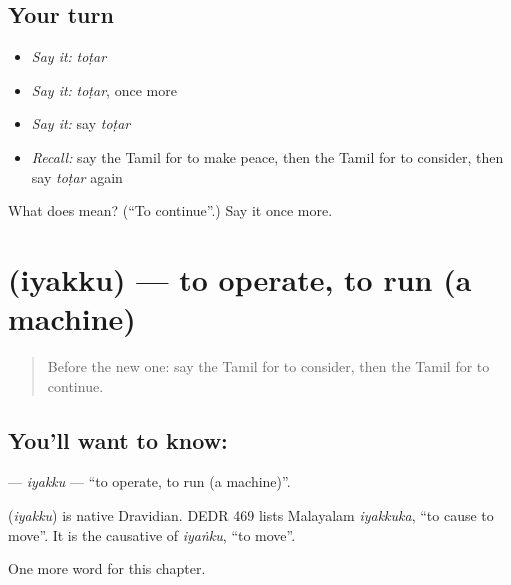 \subsection*{Your turn}
\begin{itemize}
\raggedright
  \item \emph{Say it:} \emph{toṭar}
  \item \emph{Say it:} \emph{toṭar}, once more
  \item \emph{Say it:} say \emph{toṭar}
  \item \emph{Recall:} say the Tamil for to make peace, then the Tamil for to consider, then say \emph{toṭar} again
\end{itemize}

\begin{tcolorbox}[breakable,colback=teal!4,colframe=teal!35!black,title={Before you move on}]
What does  mean? (\textquotedblleft{}To continue\textquotedblright{}.) Say it once more.
\end{tcolorbox}
\section[\texorpdfstring{\ta{இயக்கு} (iyakku)}{இயக்கு (iyakku)}]{ (iyakku) — to operate, to run (a machine)}

\label{lesson:TA-C167-iyakku}



\begin{quote}
Before the new one: say the Tamil for to consider, then the Tamil for to continue.
\end{quote}

\subsection*{You'll want to know: }
\textbf{} — \emph{iyakku} — \textquotedblleft{}to operate, to run (a machine)\textquotedblright{}.

\begin{cousinweb}
\textbf{} (\emph{iyakku}) is native Dravidian. DEDR 469 lists Malayalam \emph{iyakkuka}, \textquotedblleft{}to cause to move\textquotedblright{}. It is the causative of \emph{iyaṅku}, \textquotedblleft{}to move\textquotedblright{}.
\end{cousinweb}

\begin{grammarlens}[title={What you've built}]
One more word for this chapter.
\end{grammarlens}

